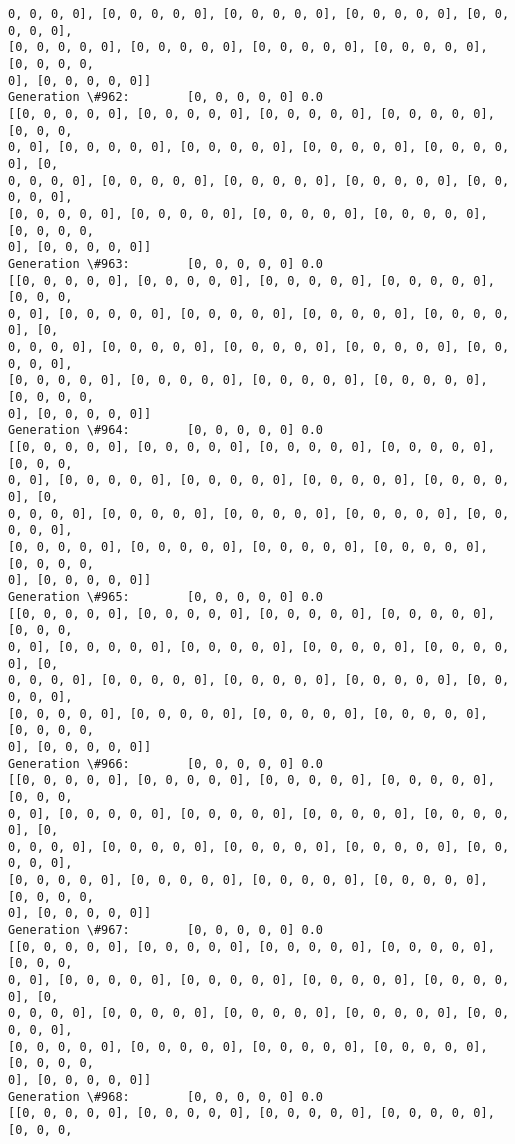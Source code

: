 \documentclass[11pt]{article}
\begin{document}
\begin{Verbatim}[commandchars=\\\{\}]
0, 0, 0, 0], [0, 0, 0, 0, 0], [0, 0, 0, 0, 0], [0, 0, 0, 0, 0], [0, 0, 0, 0, 0],
[0, 0, 0, 0, 0], [0, 0, 0, 0, 0], [0, 0, 0, 0, 0], [0, 0, 0, 0, 0], [0, 0, 0, 0,
0], [0, 0, 0, 0, 0]]
Generation \#962:        [0, 0, 0, 0, 0] 0.0
[[0, 0, 0, 0, 0], [0, 0, 0, 0, 0], [0, 0, 0, 0, 0], [0, 0, 0, 0, 0], [0, 0, 0,
0, 0], [0, 0, 0, 0, 0], [0, 0, 0, 0, 0], [0, 0, 0, 0, 0], [0, 0, 0, 0, 0], [0,
0, 0, 0, 0], [0, 0, 0, 0, 0], [0, 0, 0, 0, 0], [0, 0, 0, 0, 0], [0, 0, 0, 0, 0],
[0, 0, 0, 0, 0], [0, 0, 0, 0, 0], [0, 0, 0, 0, 0], [0, 0, 0, 0, 0], [0, 0, 0, 0,
0], [0, 0, 0, 0, 0]]
Generation \#963:        [0, 0, 0, 0, 0] 0.0
[[0, 0, 0, 0, 0], [0, 0, 0, 0, 0], [0, 0, 0, 0, 0], [0, 0, 0, 0, 0], [0, 0, 0,
0, 0], [0, 0, 0, 0, 0], [0, 0, 0, 0, 0], [0, 0, 0, 0, 0], [0, 0, 0, 0, 0], [0,
0, 0, 0, 0], [0, 0, 0, 0, 0], [0, 0, 0, 0, 0], [0, 0, 0, 0, 0], [0, 0, 0, 0, 0],
[0, 0, 0, 0, 0], [0, 0, 0, 0, 0], [0, 0, 0, 0, 0], [0, 0, 0, 0, 0], [0, 0, 0, 0,
0], [0, 0, 0, 0, 0]]
Generation \#964:        [0, 0, 0, 0, 0] 0.0
[[0, 0, 0, 0, 0], [0, 0, 0, 0, 0], [0, 0, 0, 0, 0], [0, 0, 0, 0, 0], [0, 0, 0,
0, 0], [0, 0, 0, 0, 0], [0, 0, 0, 0, 0], [0, 0, 0, 0, 0], [0, 0, 0, 0, 0], [0,
0, 0, 0, 0], [0, 0, 0, 0, 0], [0, 0, 0, 0, 0], [0, 0, 0, 0, 0], [0, 0, 0, 0, 0],
[0, 0, 0, 0, 0], [0, 0, 0, 0, 0], [0, 0, 0, 0, 0], [0, 0, 0, 0, 0], [0, 0, 0, 0,
0], [0, 0, 0, 0, 0]]
Generation \#965:        [0, 0, 0, 0, 0] 0.0
[[0, 0, 0, 0, 0], [0, 0, 0, 0, 0], [0, 0, 0, 0, 0], [0, 0, 0, 0, 0], [0, 0, 0,
0, 0], [0, 0, 0, 0, 0], [0, 0, 0, 0, 0], [0, 0, 0, 0, 0], [0, 0, 0, 0, 0], [0,
0, 0, 0, 0], [0, 0, 0, 0, 0], [0, 0, 0, 0, 0], [0, 0, 0, 0, 0], [0, 0, 0, 0, 0],
[0, 0, 0, 0, 0], [0, 0, 0, 0, 0], [0, 0, 0, 0, 0], [0, 0, 0, 0, 0], [0, 0, 0, 0,
0], [0, 0, 0, 0, 0]]
Generation \#966:        [0, 0, 0, 0, 0] 0.0
[[0, 0, 0, 0, 0], [0, 0, 0, 0, 0], [0, 0, 0, 0, 0], [0, 0, 0, 0, 0], [0, 0, 0,
0, 0], [0, 0, 0, 0, 0], [0, 0, 0, 0, 0], [0, 0, 0, 0, 0], [0, 0, 0, 0, 0], [0,
0, 0, 0, 0], [0, 0, 0, 0, 0], [0, 0, 0, 0, 0], [0, 0, 0, 0, 0], [0, 0, 0, 0, 0],
[0, 0, 0, 0, 0], [0, 0, 0, 0, 0], [0, 0, 0, 0, 0], [0, 0, 0, 0, 0], [0, 0, 0, 0,
0], [0, 0, 0, 0, 0]]
Generation \#967:        [0, 0, 0, 0, 0] 0.0
[[0, 0, 0, 0, 0], [0, 0, 0, 0, 0], [0, 0, 0, 0, 0], [0, 0, 0, 0, 0], [0, 0, 0,
0, 0], [0, 0, 0, 0, 0], [0, 0, 0, 0, 0], [0, 0, 0, 0, 0], [0, 0, 0, 0, 0], [0,
0, 0, 0, 0], [0, 0, 0, 0, 0], [0, 0, 0, 0, 0], [0, 0, 0, 0, 0], [0, 0, 0, 0, 0],
[0, 0, 0, 0, 0], [0, 0, 0, 0, 0], [0, 0, 0, 0, 0], [0, 0, 0, 0, 0], [0, 0, 0, 0,
0], [0, 0, 0, 0, 0]]
Generation \#968:        [0, 0, 0, 0, 0] 0.0
[[0, 0, 0, 0, 0], [0, 0, 0, 0, 0], [0, 0, 0, 0, 0], [0, 0, 0, 0, 0], [0, 0, 0,

\end{Verbatim}
\end{document}
